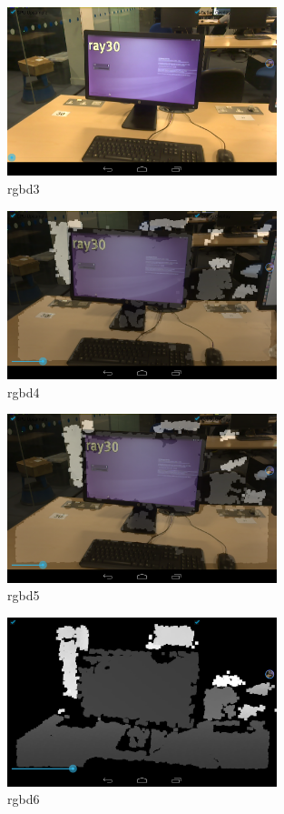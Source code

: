 \documentclass[12pt,twoside]{article}
\begin{document}
\begin{figure}[h]
    \centering
    \includegraphics[width=0.7\textwidth]{figures/rgbd3}
    \caption{rgbd3}
    \label{fig: rgbd3}
\end{figure}

\begin{figure}[h]
    \centering
    \includegraphics[width=0.7\textwidth]{figures/rgbd4}
    \caption{rgbd4}
    \label{fig: rgbd4}
\end{figure}

\begin{figure}[h]
    \centering
    \includegraphics[width=0.7\textwidth]{figures/rgbd5}
    \caption{rgbd5}
    \label{fig: rgbd5}
\end{figure}

\begin{figure}[h]
    \centering
    \includegraphics[width=0.7\textwidth]{figures/rgbd6}
    \caption{rgbd6}
    \label{fig: rgbd6}
\end{figure}
\end{document}
